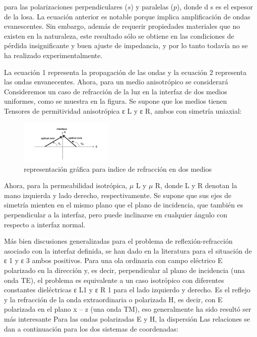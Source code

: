 \documentclass[a4paper, twocolumn, 10pt]{article}
\begin{document}
\noindent para las polarizaciones perpendiculares ($s$) y paralelas ($p$), donde d s es el espesor de la losa. La ecuación anterior es notable porque implica amplificación de ondas evanescentes. Sin embargo, además de requerir propiedades materiales que no existen en la naturaleza, este resultado sólo se obtiene en las condiciones de pérdida insignificante y buen ajuste de impedancia, y por lo tanto todavía no se ha realizado experimentalmente.

\noindent La ecuación 1 representa la propagación de las ondas y la ecuación 2 representa las ondas envanecentes.
Ahora, para un medio anisotrópico se considerará Consideremos un caso de refracción de la luz en la interfaz de dos medios uniformes, como se muestra en la figura. Se supone que los medios tienen Tensores de permitividad anisotrópica ε L y ε R, ambos con simetría uniaxial:

\begin{figure}[H]
    \centering
    \includegraphics[width= 0.4\textwidth]{angulo.png}
    \caption{representación gráfica para indice de refracción en dos medios}
    \label{metasuperficie}
\end{figure}

\noindent Ahora, para la permeabilidad isotrópica, $\mu$ L y $\mu$ R, donde L y R denotan la mano izquierda y lado derecho, respectivamente. Se supone que sus ejes de simetría mienten
en el mismo plano que el plano de incidencia, que también es perpendicular a
la interfaz, pero puede inclinarse en cualquier ángulo con respecto a
interfaz normal.

Más bien discusiones generalizadas para el problema de reflexión-refracción asociado
con la interfaz definida, se han dado en la literatura para el
situación de ε 1 y ε 3 ambos positivos. Para una ola ordinaria con
campo eléctrico E polarizado en la dirección y, es decir, perpendicular al plano
de incidencia (una onda TE), el problema es equivalente a un caso isotrópico con
diferentes constantes dieléctricas ε L1 y ε R
1 para el lado izquierdo y derecho.
Es el reflejo y la refracción de la onda extraordinaria o polarizada H,
es decir, con E polarizada en el plano x – z (una onda TM), eso generalmente ha sido
resultó ser más interesante Para las ondas polarizadas E y H, la dispersión
Las relaciones se dan a continuación para los dos sistemas de coordenadas:
\end{document}
